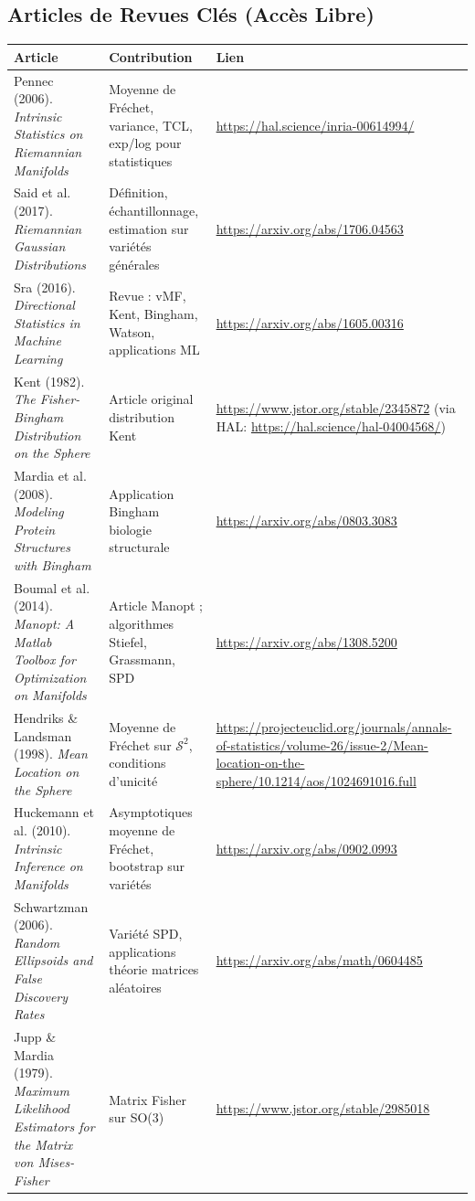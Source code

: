 \documentclass[11pt,a4paper]{article}
\begin{document}
\subsection{Articles de Revues Clés (Accès Libre)}
\begin{longtable}{@{}p{3.5cm}p{5.5cm}p{5cm}@{}}
\toprule
\textbf{Article} & \textbf{Contribution} & \textbf{Lien} \\
\midrule
Pennec (2006). \textit{Intrinsic Statistics on Riemannian Manifolds} & Moyenne de Fréchet, variance, TCL, exp/log pour statistiques & \url{https://hal.science/inria-00614994/} \\
Said et al. (2017). \textit{Riemannian Gaussian Distributions} & Définition, échantillonnage, estimation sur variétés générales & \url{https://arxiv.org/abs/1706.04563} \\
Sra (2016). \textit{Directional Statistics in Machine Learning} & Revue : vMF, Kent, Bingham, Watson, applications ML & \url{https://arxiv.org/abs/1605.00316} \\
Kent (1982). \textit{The Fisher-Bingham Distribution on the Sphere} & Article original distribution Kent & \url{https://www.jstor.org/stable/2345872} (via HAL: \url{https://hal.science/hal-04004568/}) \\
Mardia et al. (2008). \textit{Modeling Protein Structures with Bingham} & Application Bingham biologie structurale & \url{https://arxiv.org/abs/0803.3083} \\
Boumal et al. (2014). \textit{Manopt: A Matlab Toolbox for Optimization on Manifolds} & Article Manopt ; algorithmes Stiefel, Grassmann, SPD & \url{https://arxiv.org/abs/1308.5200} \\
Hendriks \& Landsman (1998). \textit{Mean Location on the Sphere} & Moyenne de Fréchet sur $\mathcal{S}^2$, conditions d'unicité & \url{https://projecteuclid.org/journals/annals-of-statistics/volume-26/issue-2/Mean-location-on-the-sphere/10.1214/aos/1024691016.full} \\
Huckemann et al. (2010). \textit{Intrinsic Inference on Manifolds} & Asymptotiques moyenne de Fréchet, bootstrap sur variétés & \url{https://arxiv.org/abs/0902.0993} \\
Schwartzman (2006). \textit{Random Ellipsoids and False Discovery Rates} & Variété SPD, applications théorie matrices aléatoires & \url{https://arxiv.org/abs/math/0604485} \\
Jupp \& Mardia (1979). \textit{Maximum Likelihood Estimators for the Matrix von Mises-Fisher} & Matrix Fisher sur SO(3) & \url{https://www.jstor.org/stable/2985018} \\
\bottomrule
\end{longtable}
\end{document}
